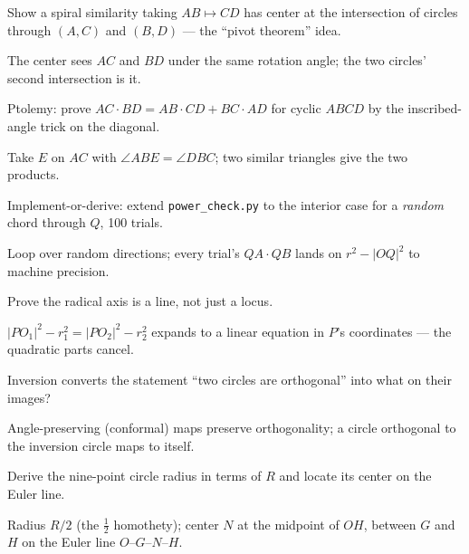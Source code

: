 \begin{exercise}[medium]\label{exr:ga7}
Show a spiral similarity taking $AB\mapsto CD$ has center at the
intersection of circles through $(A,C)$ and $(B,D)$ --- the
``pivot theorem'' idea.
\end{exercise}
\begin{solution}
The center sees $AC$ and $BD$ under the same rotation angle; the two
circles' second intersection is it.
\end{solution}
\begin{exercise}[medium]\label{exr:ga8}
Ptolemy: prove $AC\cdot BD = AB\cdot CD + BC\cdot AD$ for cyclic $ABCD$
by the inscribed-angle trick on the diagonal.
\end{exercise}
\begin{solution}
Take $E$ on $AC$ with $\angle ABE=\angle DBC$; two similar triangles
give the two products.
\end{solution}
\begin{exercise}[medium]\label{exr:ga9}
Implement-or-derive: extend \texttt{power\_check.py} to the interior
case for a \emph{random} chord through $Q$, 100 trials.
\end{exercise}
\begin{solution}
Loop over random directions; every trial's $QA\cdot QB$ lands on
$r^2-|OQ|^2$ to machine precision.
\end{solution}
\begin{exercise}[hard]\label{exr:ga10}
Prove the radical axis is a line, not just a locus.
\end{exercise}
\begin{solution}
$|PO_1|^2-r_1^2 = |PO_2|^2-r_2^2$ expands to a linear equation in
$P$'s coordinates --- the quadratic parts cancel.
\end{solution}
\begin{exercise}[hard]\label{exr:ga11}
Inversion converts the statement ``two circles are orthogonal'' into
what on their images?
\end{exercise}
\begin{solution}
Angle-preserving (conformal) maps preserve orthogonality; a circle
orthogonal to the inversion circle maps to itself.
\end{solution}
\begin{exercise}[hard]\label{exr:ga12}
Derive the nine-point circle radius in terms of $R$ and locate its
center on the Euler line.
\end{exercise}
\begin{solution}
Radius $R/2$ (the $\tfrac12$ homothety); center $N$ at the midpoint of
$OH$, between $G$ and $H$ on the Euler line $O$--$G$--$N$--$H$.
\end{solution}
